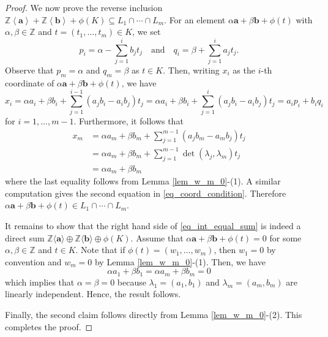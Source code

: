 \documentclass[10pt]{amsart}
\theoremstyle{plain}
\theoremstyle{definition}
\numberwithin{equation}{section}
\newcommand{\ZZ}{\mathbb{Z}}
\begin{document}
\begin{proof}
We now prove the reverse inclusion $\mathbb{Z}\left<\mathbf{a}\right> + \mathbb{Z}\left<\mathbf{b}\right>+ \phi(K)\subseteq L_1\cap \cdots \cap L_m$. For an element $\alpha \mathbf{a} + \beta \mathbf{b} + \phi(t)$ with $\alpha, \beta\in \mathbb{Z}$ and $t=(t_1, \dots, t_m) \in K$, we set 
\[
p_i=\alpha - \sum_{j=1}^i b_jt_j \quad \text{and} \quad q_i=\beta + \sum_{j=1}^i a_jt_j.
\]
Observe that $p_m= \alpha$ and $q_m= \beta$ as $t\in K$.
Then, writing $x_i$ as the $i$-th coordinate of $\alpha \mathbf{a} + \beta \mathbf{b} + \phi(t)$, we have 
\[
x_i = \alpha a_i + \beta b_i + \sum_{j=1}^{i-1}(a_jb_i-a_ib_j)t_j = \alpha a_i + \beta b_i + \sum_{j=1}^{i}(a_jb_i-a_ib_j)t_j  =  a_ip_i+b_iq_i
\]
for $i=1,\dots, m-1$. Furthermore, it follows that 
\begin{equation*}
\begin{split}
x_m& =\alpha a_m + \beta b_m + \sum_{j=1}^{m-1}(a_jb_m-a_mb_j)t_j\\
&= \alpha a_m + \beta b_m + \sum_{j=1}^{m-1} \det (\lambda_j, \lambda_m)t_j  \\
&= \alpha a_m + \beta b_m 
\end{split}
\end{equation*}
where the last equality follows from Lemma \ref{lem_w_m_0}-(1). A similar computation gives the second equation in \eqref{eq_coord_condition}. Therefore
$\alpha \mathbf{a} + \beta \mathbf{b} + \phi(t)\in L_1 \cap \cdots \cap L_m$.

It remains to show that the right hand side of \eqref{eq_int_equal_sum} is indeed a direct sum $\ZZ\langle\textbf{a}\rangle\oplus\ZZ\langle\textbf{b}\rangle\oplus\phi(K)$. 
Assume that $\alpha \mathbf{a} + \beta \mathbf{b} + \phi(t)=0$ for some $\alpha, \beta\in \ZZ$ and $t\in K$. Note that if $\phi(t)=(w_1, \dots, w_m)$, then $w_1=0$ by convention and $w_m=0$ by Lemma \ref{lem_w_m_0}-(1). Then, we have 
\[
\alpha a_1+ \beta b_1 = \alpha a_m + \beta b_m = 0
\]
which implies that $\alpha=\beta=0$ because $\lambda_1=(a_1, b_1)$ and $\lambda_m=(a_m, b_m)$ are linearly independent. Hence, the result follows. 


Finally, the second claim follows directly from Lemma \ref{lem_w_m_0}-(2). This completes the proof.
\end{proof}
\end{document}
